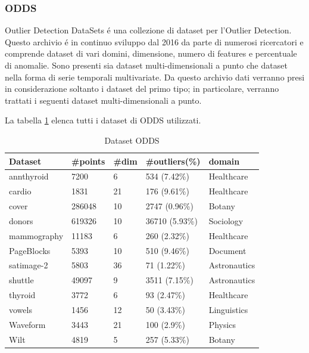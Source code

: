 \subsubsection{ODDS}
Outlier Detection DataSets é una collezione di dataset per l'Outlier Detection. Questo archivio é in continuo sviluppo dal 2016 da parte di numerosi ricercatori e comprende dataset di vari domini, dimensione, numero di features e percentuale di anomalie. 
Sono presenti sia dataset multi-dimensionali a punto che dataset nella forma di serie temporali multivariate. Da questo archivio dati verranno presi in considerazione soltanto i dataset del primo tipo; in particolare, verranno trattati i seguenti dataset multi-dimensionali a punto.

La tabella \ref{odds} elenca tutti i dataset di ODDS utilizzati.

\begin{table}
	
	\centering
	\begin{tabular}{|l|l|l|l|l|}
		\hline
		\textbf{Dataset} & \textbf{\#points} & \textbf{\#dim} & \textbf{\#outliers(\%)} & \textbf{domain} \\ \hline
		annthyroid       & 7200              & 6              & 534 (7.42\%)            & Healthcare      \\ \hline
		cardio           & 1831              & 21             & 176 (9.61\%)            & Healthcare      \\ \hline
		cover            & 286048            & 10             & 2747 (0.96\%)           & Botany          \\ \hline
		donors           & 619326            & 10             & 36710 (5.93\%)          & Sociology       \\ \hline
		mammography      & 11183             & 6              & 260 (2.32\%)            & Healthcare      \\ \hline
		PageBlocks       & 5393              & 10             & 510 (9.46\%)            & Document        \\ \hline
		satimage-2       & 5803              & 36             & 71 (1.22\%)             & Astronautics    \\ \hline
		shuttle          & 49097             & 9              & 3511 (7.15\%)           & Astronautics    \\ \hline
		thyroid          & 3772              & 6              & 93 (2.47\%)             & Healthcare      \\ \hline
		vowels           & 1456              & 12             & 50 (3.43\%)             & Linguistics     \\ \hline
		Waveform         & 3443              & 21             & 100 (2.9\%)             & Physics         \\ \hline
		Wilt             & 4819              & 5              & 257 (5.33\%)            & Botany          \\ \hline
	\end{tabular}
	\caption{\label{odds}Dataset ODDS}
\end{table}

